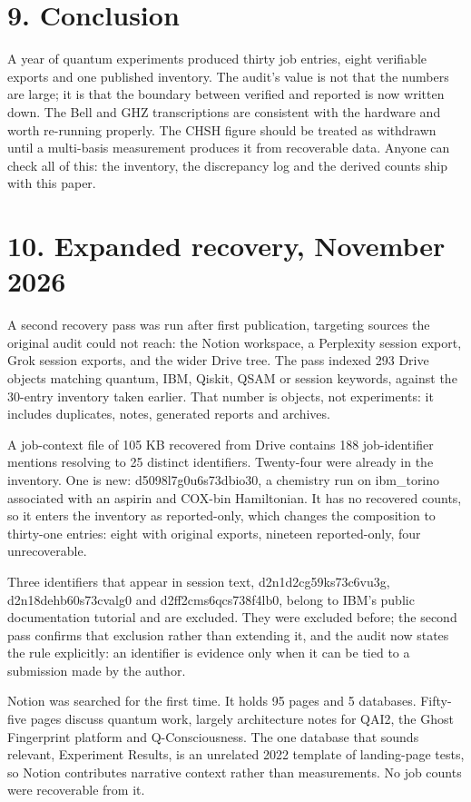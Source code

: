 \documentclass[11pt]{article}
\begin{document}
\section*{9. Conclusion}
A year of quantum experiments produced thirty job entries, eight verifiable exports and one published inventory. The audit's value is not that the numbers are large; it is that the boundary between verified and reported is now written down. The Bell and GHZ transcriptions are consistent with the hardware and worth re-running properly. The CHSH figure should be treated as withdrawn until a multi-basis measurement produces it from recoverable data. Anyone can check all of this: the inventory, the discrepancy log and the derived counts ship with this paper.

\section*{10. Expanded recovery, November 2026}

A second recovery pass was run after first publication, targeting sources the original audit could not reach: the Notion workspace, a Perplexity session export, Grok session exports, and the wider Drive tree. The pass indexed 293 Drive objects matching quantum, IBM, Qiskit, QSAM or session keywords, against the 30-entry inventory taken earlier. That number is objects, not experiments: it includes duplicates, notes, generated reports and archives.

A job-context file of 105 KB recovered from Drive contains 188 job-identifier mentions resolving to 25 distinct identifiers. Twenty-four were already in the inventory. One is new: d5098l7g0u6s73dbio30, a chemistry run on ibm_torino associated with an aspirin and COX-bin Hamiltonian. It has no recovered counts, so it enters the inventory as reported-only, which changes the composition to thirty-one entries: eight with original exports, nineteen reported-only, four unrecoverable.

Three identifiers that appear in session text, d2n1d2cg59ks73c6vu3g, d2n18dehb60s73cvalg0 and d2ff2cms6qcs738f4lb0, belong to IBM's public documentation tutorial and are excluded. They were excluded before; the second pass confirms that exclusion rather than extending it, and the audit now states the rule explicitly: an identifier is evidence only when it can be tied to a submission made by the author.

Notion was searched for the first time. It holds 95 pages and 5 databases. Fifty-five pages discuss quantum work, largely architecture notes for QAI2, the Ghost Fingerprint platform and Q-Consciousness. The one database that sounds relevant, Experiment Results, is an unrelated 2022 template of landing-page tests, so Notion contributes narrative context rather than measurements. No job counts were recoverable from it.
\end{document}
